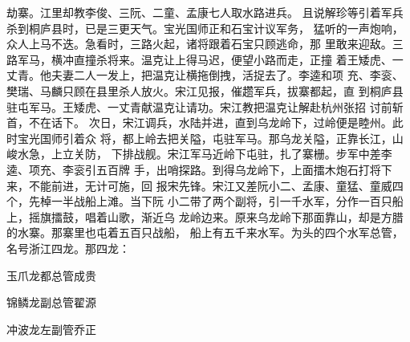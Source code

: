 劫寨。江里却教李俊、三阮、二童、孟康七人取水路进兵。
且说解珍等引着军兵杀到桐庐县时，已是三更天气。宝光国师正和石宝计议军务，
猛听的一声炮响，众人上马不迭。急看时，三路火起，诸将跟着石宝只顾逃命，那
里敢来迎敌。三路军马，横冲直撞杀将来。温克让上得马迟，便望小路而走，正撞
着王矮虎、一丈青。他夫妻二人一发上，把温克让横拖倒拽，活捉去了。李逵和项
充、李衮、樊瑞、马麟只顾在县里杀人放火。宋江见报，催趱军兵，拔寨都起，直
到桐庐县驻屯军马。王矮虎、一丈青献温克让请功。宋江教把温克让解赴杭州张招
讨前斩首，不在话下。
次日，宋江调兵，水陆并进，直到乌龙岭下，过岭便是睦州。此时宝光国师引着众
将，都上岭去把关隘，屯驻军马。那乌龙关隘，正靠长江，山峻水急，上立关防，
下排战舰。宋江军马近岭下屯驻，扎了寨栅。步军中差李逵、项充、李衮引五百牌
手，出哨探路。到得乌龙岭下，上面擂木炮石打将下来，不能前进，无计可施，回
报宋先锋。宋江又差阮小二、孟康、童猛、童威四个，先棹一半战船上滩。当下阮
小二带了两个副将，引一千水军，分作一百只船上，摇旗擂鼓，唱着山歌，渐近乌
龙岭边来。原来乌龙岭下那面靠山，却是方腊的水寨。那寨里也屯着五百只战船，
船上有五千来水军。为头的四个水军总管，名号浙江四龙。那四龙：

玉爪龙都总管成贵

锦鳞龙副总管翟源

冲波龙左副管乔正

